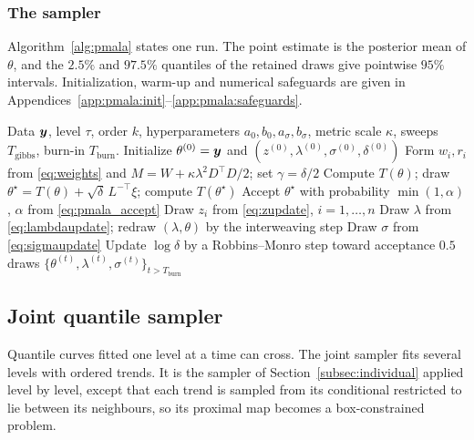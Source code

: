 \subsubsection{The sampler}

Algorithm~\ref{alg:pmala} states one run. The point estimate is the posterior mean of $\theta$, and the $2.5\%$ and $97.5\%$ quantiles of the retained draws give pointwise $95\%$ intervals. Initialization, warm-up and numerical safeguards are given in Appendices~\ref{app:pmala:init}--\ref{app:pmala:safeguards}.

\begin{algorithm}[h!]
\caption{Bayesian-PMALA for a single quantile level $\tau$}
\label{alg:pmala}
\begin{algorithmic}[1]
\Require Data $\bm{y}$, level $\tau$, order $k$, hyperparameters $a_0, b_0, a_\sigma, b_\sigma$, metric scale $\kappa$, sweeps $T_{\mathrm{gibbs}}$, burn-in $T_{\mathrm{burn}}$.
\State Initialize $\theta^{(0)} = \bm{y}$ and $(z^{(0)}, \lambda^{(0)}, \sigma^{(0)}, \delta^{(0)})$ 
    \State Form $w_i, r_i$ from \eqref{eq:weights} and $M = W + \kappa\lambda^2 D^\top D/2$; set $\gamma = \delta/2$
    \State Compute $T(\theta)$; draw $\theta^\star = T(\theta) + \sqrt{\delta}\,L^{-\top}\xi$; compute $T(\theta^\star)$ 
    \State Accept $\theta^\star$ with probability $\min(1,\alpha)$, $\alpha$ from \eqref{eq:pmala_accept}
    \State Draw $z_i$ from \eqref{eq:zupdate}, $i = 1, \ldots, n$
    \State Draw $\lambda$ from \eqref{eq:lambdaupdate}; redraw $(\lambda, \theta)$ by the interweaving step
    \State Draw $\sigma$ from \eqref{eq:sigmaupdate}
    \State Update $\log\delta$ by a Robbins--Monro step toward acceptance $0.5$
\EndFor
\State \Return draws $\{\theta^{(t)}, \lambda^{(t)}, \sigma^{(t)}\}_{t > T_{\mathrm{burn}}}$
\end{algorithmic}
\end{algorithm}

\subsection{Joint quantile sampler}
\label{subsec:joint}

Quantile curves fitted one level at a time can cross. The joint sampler fits several levels with ordered trends. It is the sampler of Section~\ref{subsec:individual} applied level by level, except that each trend is sampled from its conditional restricted to lie between its neighbours, so its proximal map becomes a box-constrained problem.

